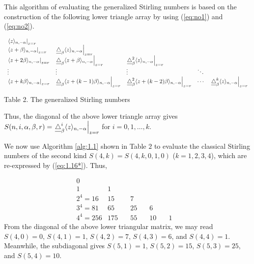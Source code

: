 \begin{algorithm}\label{alg:1.1}
This algorithm of evaluating the generalized Stirling numbers is based on the construction of the following lower triangle array by using (\ref{eq:no1}) and (\ref{eq:no2}).

\begin{center}
\[
\begin{array}{lllll}
\left.
\langle z\rangle_{n,-\alpha}\right|_{z=r} & & & & \\
\left. \langle z+\beta \rangle_{n,-\alpha} \right|_{z=r}&
\left. \underline\triangle_{\beta}\langle z\rangle_{n,-\alpha} \right|_{z=r}& & &\\
\left. \langle z+2\beta \rangle_{n,-\alpha} \right|_{z=r}&
\left. \underline\triangle_{\beta}\langle z+\beta \rangle_{n,-\alpha} \right|_{z=r}&
\left. \underline\triangle^2_{\beta}\langle z\rangle_{n,-\alpha}\right|_{z=r} & & \\
\vdots &\vdots &\vdots &\ddots &\\
\left. \langle z+k\beta \rangle_{n,-\alpha}\right|_{z=r} &
\left. \underline\triangle_{\beta} \langle z+(k-1)\beta \rangle_{n,-\alpha}\right|_{z=r} &
\left. \underline\triangle^2_{\beta} \langle z+(k-2)\beta\rangle_{n,-\alpha}\right|_{z=r} &
\cdots & \left. \underline\triangle^k_\beta \langle z\rangle_{n,-\alpha}\right|_{z=r}
\end{array}
\]
\centerline{Table 2.
The generalized Stirling numbers
}
\end{center}
\vspace{.15in}
Thus, the diagonal of the above lower triangle array gives $S(n,i,\alpha,\beta,r)=\left.\underline\triangle^i_\beta\langle z\rangle_{n,-\alpha}\right|_{z=r}$ for $i=0,1,\ldots, k$.
\end{algorithm}

 We now use Algorithm \ref{alg:1.1} shown in Table $2$ to evaluate the classical Stirling numbers of the second kind $S(4,k)=S(4, k, 0,1,0)$ ($k=1,2,3,4$), which are re-expressed by (\ref{eq:1.16*}). Thus,

\[
\begin{array}{lllll}
0 & \quad &\quad  & \quad & \quad  \\
1 &1 \quad & & & \\
2^4=16 & 15 \quad & 7 \quad & & \\
3^4=81 & 65 \quad & 25\quad  & 6\quad  &\\
4^4=256 & 175 \quad & 55 \quad & 10 \quad &1\quad
\end{array}
\]
From the diagonal of the above lower triangular matrix, we may read $S(4,0)=0$, $S(4,1)=1$, $S(4,2)=7$, $S(4,3)=6$, and $S(4,4)=1$. Meanwhile, the subdiagonal gives $S(5,1)=1$, $S(5,2)=15$, $S(5,3)=25$, and $S(5,4)=10$.

